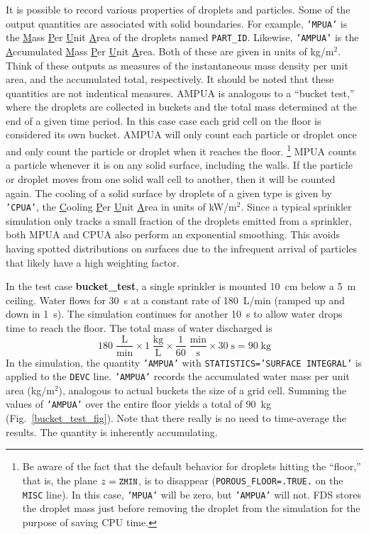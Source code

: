 \documentclass[11pt]{book}
\newcommand{\ct}{\tt\small}
\newcommand{\be}{\begin{equation}}
\newcommand{\ee}{\end{equation}}
\begin{document}
It is possible to record various properties of droplets and particles. Some of the output quantities are associated with solid boundaries. For example,
{\ct 'MPUA'} is the \underline{M}ass \underline{P}er \underline{U}nit \underline{A}rea of the droplets named {\ct PART\_ID}.
Likewise, {\ct 'AMPUA'} is the \underline{A}ccumulated \underline{M}ass \underline{P}er \underline{U}nit \underline{A}rea.
Both of these are given in units of kg/m$^2$. Think of these outputs as measures of the instantaneous mass density per unit area,
and the accumulated total, respectively.  It should be noted that these quantities are not indentical measures.  AMPUA is analogous to a ``bucket test,'' where the droplets are collected in buckets and the total mass determined at the end of a given time period.  In this case case each grid cell on the floor is considered its own bucket.  AMPUA will only count each particle or droplet once and only count the particle or droplet when it reaches the floor.  \footnote{Be aware of the fact that the default behavior for droplets hitting the ``floor,'' that is, the plane $z=\hbox{\ct ZMIN}$,
is to disappear ({\ct POROUS\_FLOOR=.TRUE.} on the {\ct MISC} line).
In this case, {\ct 'MPUA'} will be zero, but {\ct 'AMPUA'} will not. FDS stores the droplet mass just before removing the droplet from
the simulation for the purpose of saving CPU time.} MPUA counts a particle whenever it is on any solid surface, including the walls.  If the particle or droplet moves from one solid wall
cell to another, then it will be counted again.  The cooling of a solid surface by droplets of a
given type is given by {\ct 'CPUA'}, the \underline{C}ooling \underline{P}er \underline{U}nit \underline{A}rea in units of kW/m$^2$.  Since a typical sprinkler simulation only tracks a small fraction of the droplets emitted from a sprinkler, both MPUA and CPUA also perform an exponential smoothing.  This avoids having spotted distributions on surfaces due to the infrequent arrival of particles that likely have a high weighting factor.

In the test case {\bf bucket\_test}, a single sprinkler is
mounted 10~cm below a 5~m ceiling. Water flows for 30~s at a constant
rate of 180~L/min (ramped up and down in 1~s).  The simulation continues for another 10~s to allow
water drops time to reach the floor. The total mass of water discharged is
\be
  \mathrm{ 180 \; \frac{L}{min} \times 1 \; \frac{kg}{L} \times \frac{1}{60} \; \frac{min}{s} \times 30 \; s = 90 \; kg }
\ee
In the simulation, the quantity {\ct 'AMPUA'} with {\ct STATISTICS='SURFACE INTEGRAL'} is applied to the {\ct DEVC} line.
{\ct 'AMPUA'} records the accumulated water mass per unit area (kg/m$^2$), analogous to actual buckets the size of a grid cell.
Summing the values of {\ct 'AMPUA'} over the entire
floor yields a total of 90~kg (Fig.~\ref{bucket_test_fig}). Note that there really is no need to time-average the results. The quantity is inherently accumulating.
\end{document}
